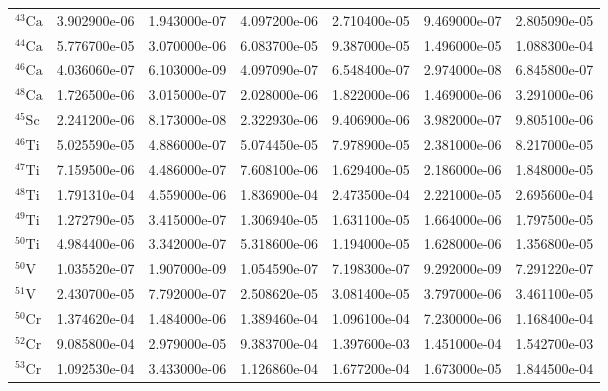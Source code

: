 \begin{tabular}{lrrrrrr}
$^{43}\mathrm{Ca}$  &       3.902900e-06 &      1.943000e-07 &      4.097200e-06 &       2.710400e-05 &      9.469000e-07 &      2.805090e-05 \\
$^{44}\mathrm{Ca}$  &       5.776700e-05 &      3.070000e-06 &      6.083700e-05 &       9.387000e-05 &      1.496000e-05 &      1.088300e-04 \\
$^{46}\mathrm{Ca}$  &       4.036060e-07 &      6.103000e-09 &      4.097090e-07 &       6.548400e-07 &      2.974000e-08 &      6.845800e-07 \\
$^{48}\mathrm{Ca}$  &       1.726500e-06 &      3.015000e-07 &      2.028000e-06 &       1.822000e-06 &      1.469000e-06 &      3.291000e-06 \\
$^{45}\mathrm{Sc}$  &       2.241200e-06 &      8.173000e-08 &      2.322930e-06 &       9.406900e-06 &      3.982000e-07 &      9.805100e-06 \\
$^{46}\mathrm{Ti}$  &       5.025590e-05 &      4.886000e-07 &      5.074450e-05 &       7.978900e-05 &      2.381000e-06 &      8.217000e-05 \\
$^{47}\mathrm{Ti}$  &       7.159500e-06 &      4.486000e-07 &      7.608100e-06 &       1.629400e-05 &      2.186000e-06 &      1.848000e-05 \\
$^{48}\mathrm{Ti}$  &       1.791310e-04 &      4.559000e-06 &      1.836900e-04 &       2.473500e-04 &      2.221000e-05 &      2.695600e-04 \\
$^{49}\mathrm{Ti}$  &       1.272790e-05 &      3.415000e-07 &      1.306940e-05 &       1.631100e-05 &      1.664000e-06 &      1.797500e-05 \\
$^{50}\mathrm{Ti}$  &       4.984400e-06 &      3.342000e-07 &      5.318600e-06 &       1.194000e-05 &      1.628000e-06 &      1.356800e-05 \\
$^{50}\mathrm{V}$   &       1.035520e-07 &      1.907000e-09 &      1.054590e-07 &       7.198300e-07 &      9.292000e-09 &      7.291220e-07 \\
$^{51}\mathrm{V}$   &       2.430700e-05 &      7.792000e-07 &      2.508620e-05 &       3.081400e-05 &      3.797000e-06 &      3.461100e-05 \\
$^{50}\mathrm{Cr}$  &       1.374620e-04 &      1.484000e-06 &      1.389460e-04 &       1.096100e-04 &      7.230000e-06 &      1.168400e-04 \\
$^{52}\mathrm{Cr}$  &       9.085800e-04 &      2.979000e-05 &      9.383700e-04 &       1.397600e-03 &      1.451000e-04 &      1.542700e-03 \\
$^{53}\mathrm{Cr}$  &       1.092530e-04 &      3.433000e-06 &      1.126860e-04 &       1.677200e-04 &      1.673000e-05 &      1.844500e-04 \\

\end{tabular}
